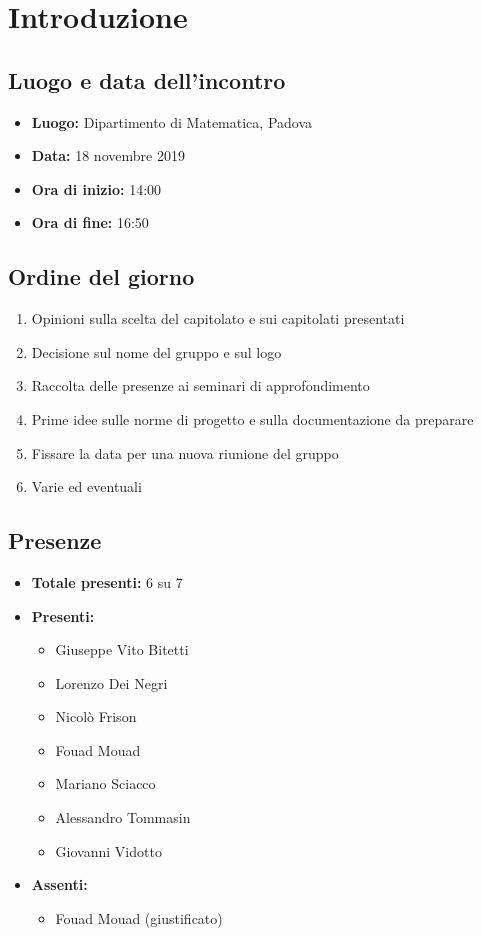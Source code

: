 \section*{Introduzione}

\subsection*{Luogo e data dell'incontro}
	\begin{itemize}
		\item \textbf{Luogo:} Dipartimento di Matematica, Padova
		\item \textbf{Data:} 18 novembre 2019
		\item \textbf{Ora di inizio:} 14:00
		\item \textbf{Ora di fine:} 16:50
	\end{itemize}

\subsection*{Ordine del giorno}
	\begin{enumerate}
		\item Opinioni sulla scelta del capitolato e sui capitolati presentati
		\item Decisione sul nome del gruppo e sul logo
		\item Raccolta delle presenze ai seminari di approfondimento
		\item Prime idee sulle norme di progetto e sulla documentazione da preparare
		\item Fissare la data per una nuova riunione del gruppo
		\item Varie ed eventuali
	\end{enumerate}

\subsection*{Presenze}
	\begin{itemize}
		\item \textbf{Totale presenti:} 6 su 7
		\item \textbf{Presenti: }
			\begin{itemize}			
				\item Giuseppe Vito Bitetti
				\item Lorenzo Dei Negri
				\item Nicolò Frison
				\item Fouad Mouad
				\item Mariano Sciacco
				\item Alessandro Tommasin
				\item Giovanni Vidotto
			\end{itemize}
		\item \textbf{Assenti: } 
			\begin{itemize}	
				\item Fouad Mouad (giustificato)
			\end{itemize}
	\end{itemize}


